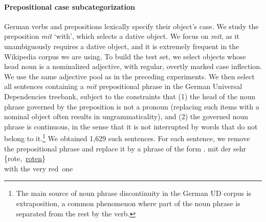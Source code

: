 %
%

\paragraph{Prepositional case subcategorization}
German verbs and prepositions lexically specify their object's case.  We
study the preposition \textit{mit} `with', which selects a dative
object. We focus on \textit{mit}, as it unambiguously requires a dative object,
and it is extremely frequent in the Wikipedia corpus we are using. To build the test set,
we select objects whose head noun is a nominalized adjective,
with regular, overtly marked case inflection.
We use the same adjective pool as in the preceding experiments.
We then select all sentences containing a \emph{mit} prepositional
phrase in the German Universal Dependencies treebank, subject to the
constraints that (1) the head of the noun phrase governed by the
preposition is not a pronoun (replacing such items with a nominal
object often results in ungrammaticality), and (2) the governed noun
phrase is continuous, in the sense that it is not interrupted by words
that do not belong to it.\footnote{The main source of noun phrase
  discontinuity in the German UD corpus is extraposition, a common
  phenomenon where part of the noun phrase is separated from the rest
  by the verb.} %
We obtained 1,629 such sentences.  For each sentence, we remove the
prepositional phrase and replace it by a phrase of the form
\exg. mit der sehr \{rote,\ \underline{roten}\} \\
with the very red\ one \\

